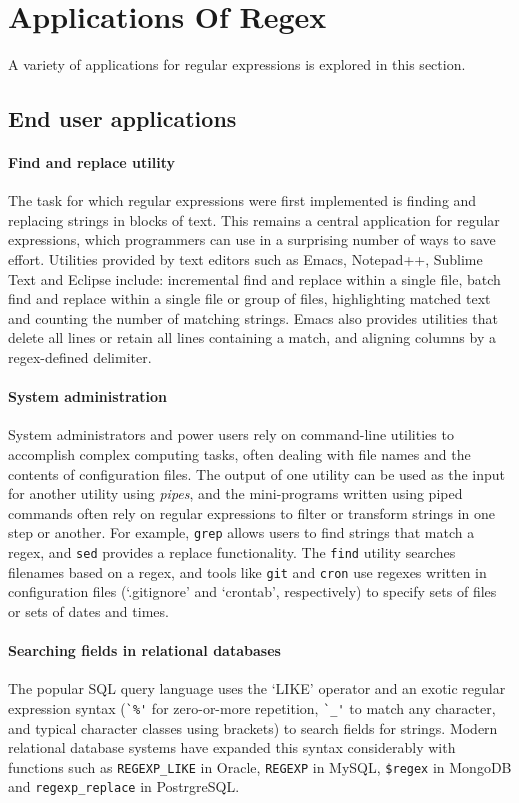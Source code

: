 \section{Applications Of Regex}
A variety of applications for regular expressions is explored in this section.

\subsection{End user applications}
\paragraph{Find and replace utility}
The task for which regular expressions were first implemented is finding and replacing strings in blocks of text.  This remains a central application for regular expressions, which programmers can use in a surprising number of ways to save effort.  Utilities provided by text editors such as Emacs, Notepad++, Sublime Text and Eclipse include: incremental find and replace within a single file, batch find and replace within a single file or group of files, highlighting matched text and counting the number of matching strings.  Emacs also provides utilities that delete all lines or retain all lines containing a match, and aligning columns by a regex-defined delimiter.

\paragraph{System administration}
System administrators and power users rely on command-line utilities to accomplish complex computing tasks, often dealing with file names and the contents of configuration files.  The output of one utility can be used as the input for another utility using \emph{pipes}, and the mini-programs written using piped commands often rely on regular expressions to filter or transform strings in one step or another.  For example, {\tt grep} allows users to find strings that match a regex, and {\tt sed} provides a replace functionality.  The {\tt find} utility searches filenames based on a regex, and tools like {\tt git} and {\tt cron} use regexes written in configuration files (`.gitignore' and `crontab', respectively) to specify sets of files or sets of dates and times.

\paragraph{Searching fields in relational databases}
The popular SQL query language uses the `LIKE' operator and an exotic regular expression syntax (\verb!`%'! for zero-or-more repetition, \verb!`_'! to match any character, and typical character classes using brackets) to search fields for strings.  Modern relational database systems have expanded this syntax considerably with functions such as {\tt REGEXP\_LIKE} in Oracle, {\tt REGEXP} in MySQL, {\tt\$regex} in MongoDB and {\tt regexp\_replace} in PostrgreSQL.


